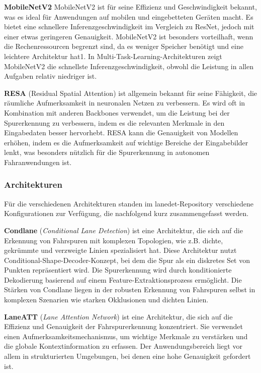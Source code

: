 \documentclass{article}
\begin{document}
                \textbf{MobileNetV2}
                MobileNetV2 ist für seine Effizienz und Geschwindigkeit bekannt, was es ideal für Anwendungen auf mobilen und eingebetteten Geräten macht. Es bietet eine schnellere Inferenzgeschwindigkeit im Vergleich zu ResNet, jedoch mit einer etwas geringeren Genauigkeit. MobileNetV2 ist besonders vorteilhaft, wenn die Rechenressourcen begrenzt sind, da es weniger Speicher benötigt und eine leichtere Architektur hat1. In Multi-Task-Learning-Architekturen zeigt MobileNetV2 die schnellste Inferenzgeschwindigkeit, obwohl die Leistung in allen Aufgaben relativ niedriger ist.
                \cite{Chen2021Deep} \cite{Abdigapporov2022Performance}

                \textbf{RESA} (Residual Spatial Attention) ist allgemein bekannt für seine Fähigkeit, die räumliche Aufmerksamkeit in neuronalen Netzen zu verbessern. Es wird oft in Kombination mit anderen Backbones verwendet, um die Leistung bei der Spurerkennung zu verbessern, indem es die relevanten Merkmale in den Eingabedaten besser hervorhebt. RESA kann die Genauigkeit von Modellen erhöhen, indem es die Aufmerksamkeit auf wichtige Bereiche der Eingabebilder lenkt, was besonders nützlich für die Spurerkennung in autonomen Fahranwendungen ist.

                
            \subsubsection{Architekturen}
                Für die verschiedenen Architekturen standen im lanedet-Repository verschiedene Konfigurationen zur Verfügung, die nachfolgend kurz zusammengefasst werden.

                \textbf{Condlane} (\textit{Conditional Lane Detection}) ist eine Architektur, die sich auf die Erkennung von Fahrspuren mit komplexen Topologien, wie z.B. dichte, gekrümmte und verzweigte Linien spezialisiert hat. Diese Architektur nutzt Conditional-Shape-Decoder-Konzept, bei dem die Spur als ein diskretes Set von Punkten repräsentiert wird. Die Spurerkennung wird durch konditionierte Dekodierung basierend auf einem Feature-Extraktionsprozess ermöglicht. Die Stärken von Condlane liegen in der robusten Erkennung von Fahrspuren selbst in komplexen Szenarien wie starken Okklusionen und dichten Linien.
                \cite{Ganeriwala2023Cross}

                \textbf{LaneATT} (\textit{Lane Attention Network}) ist eine Architektur, die sich auf die Effizienz und Genauigkeit der Fahrspurerkennung konzentriert. Sie verwendet einen Aufmerksamkeitsmechanismus, um wichtige Merkmale zu verstärken und die globale Kontextinformation zu erfassen. Der Anwendungsbereich liegt vor allem in strukturierten Umgebungen, bei denen eine hohe Genauigkeit gefordert ist. 
                \cite{He2021Fast}
\end{document}
